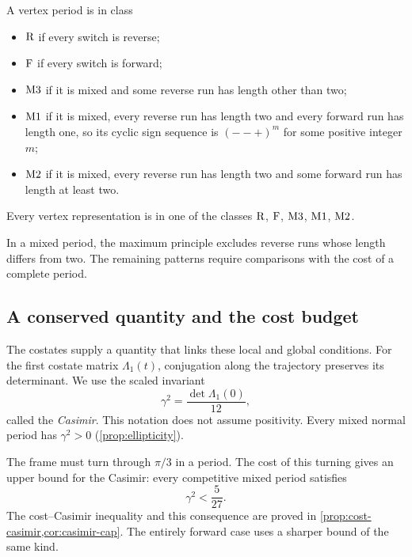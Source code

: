 \begin{definition}\label{def:classes}
A vertex period is in class
\begin{itemize}
\item $\mathrm{R}$ if every switch is reverse;
\item $\mathrm{F}$ if every switch is forward;
\item $\mathrm{M3}$ if it is mixed and some reverse run has length other than two;
\item $\mathrm{M1}$ if it is mixed, every reverse run has length two and every forward run has
  length one, so its cyclic sign sequence is $(--+)^m$ for some positive integer $m$;
\item $\mathrm{M2}$ if it is mixed, every reverse run has length two and some forward run has
  length at least two.
\end{itemize}
\end{definition}

\begin{proposition}[Partition]\label{prop:partition}
Every vertex representation is in one of the classes $\mathrm{R}$, $\mathrm{F}$, $\mathrm{M3}$,
$\mathrm{M1}$, $\mathrm{M2}$.
\end{proposition}

In a mixed period, the maximum principle excludes reverse runs whose length differs from two. The
remaining patterns require comparisons with the cost of a complete period.

\subsection{A conserved quantity and the cost budget}\label{sec:outline-casimir}

The costates supply a quantity that links these local and global conditions. For the first
costate matrix $\Lambda_1(t)$, conjugation along the trajectory preserves its determinant. We
use the scaled invariant
\[
  \gamma^2=\frac{\det\Lambda_1(0)}{12},
\]
called the \emph{Casimir}. This notation does not assume positivity. Every mixed normal period has $\gamma^2>0$ (\cref{prop:ellipticity}).

The frame must turn through $\pi/3$ in a period. The cost of this turning gives an upper bound
for the Casimir: every competitive mixed period satisfies
\[
  \gamma^2<\frac5{27}.
\]
The cost--Casimir inequality and this consequence are proved in
\cref{prop:cost-casimir,cor:casimir-cap}. The entirely forward case uses a sharper bound of the
same kind.

